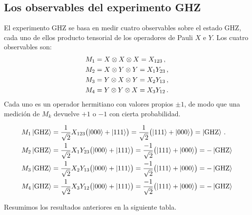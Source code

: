 \documentclass[]{unirTema}
\begin{document}
\subsection{Los observables del experimento GHZ}

El experimento GHZ se basa en medir cuatro observables sobre el estado GHZ, cada uno de ellos producto tensorial de los operadores de Pauli $X$ e $Y$. Los cuatro observables son:
\begin{align*}
  M_1 & = X\otimes X\otimes X = X_{123}\,,    \\
  M_2 & = X\otimes Y\otimes Y = X_1 Y_{23}\,, \\
  M_3 & = Y\otimes X\otimes Y = X_2 Y_{13}\,, \\
  M_4 & = Y\otimes Y\otimes X = X_3 Y_{12}\,.
\end{align*}
Cada uno es un operador hermitiano con valores propios $\pm 1$, de modo que una medición de $M_k$ devuelve $+1$ o $-1$ con cierta probabilidad.

\begin{eje}
  \label{eje:M1}
  \begin{align*}
    M_1 \ket{\text{GHZ}} & = \frac{1}{\sqrt{2}}X_{123}\bigl(\ket{000}+\ket{111}\bigr) = \frac{1}{\sqrt{2}}\bigl(\ket{111}+\ket{000}\bigr) = \ket{\text{GHZ}}\,.   \\
    M_2 \ket{\text{GHZ}} & = \frac{1}{\sqrt{2}}X_1 Y_{23}\bigl(\ket{000}+\ket{111}\bigr) = \frac{-1}{\sqrt{2}}\bigl(\ket{111}+\ket{000}\bigr) = -\ket{\text{GHZ}} \\
    M_3 \ket{\text{GHZ}} & = \frac{1}{\sqrt{2}}X_2 Y_{13}\bigl(\ket{000}+\ket{111}\bigr) = \frac{-1}{\sqrt{2}}\bigl(\ket{111}+\ket{000}\bigr) = -\ket{\text{GHZ}} \\
    M_4 \ket{\text{GHZ}} & = \frac{1}{\sqrt{2}}X_3 Y_{12}\bigl(\ket{000}+\ket{111}\bigr) = \frac{-1}{\sqrt{2}}\bigl(\ket{111}+\ket{000}\bigr) = -\ket{\text{GHZ}}
  \end{align*}

\end{eje}

Resumimos los resultados anteriores en la siguiente tabla.
\end{document}
